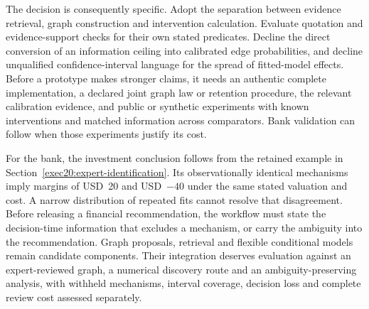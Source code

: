 The decision is consequently specific. Adopt the separation between
evidence retrieval, graph construction and intervention calculation.
Evaluate quotation and evidence-support checks for their own stated
predicates. Decline the direct conversion of an information ceiling into
calibrated edge probabilities, and decline unqualified confidence-interval
language for the spread of fitted-model effects. Before a prototype makes
stronger claims, it needs an authentic complete implementation, a declared
joint graph law or retention procedure, the relevant calibration evidence,
and public or synthetic experiments with known interventions and matched
information across comparators. Bank validation can follow when those
experiments justify its cost.

For the bank, the investment conclusion follows from the retained example in
Section~\ref{exec20:expert-identification}. Its observationally identical
mechanisms imply margins of USD~20 and USD~$-40$ under the same stated
valuation and cost. A narrow distribution of repeated fits cannot resolve
that disagreement. Before releasing a financial recommendation, the workflow
must state the decision-time information that excludes a mechanism, or carry
the ambiguity into the recommendation. Graph proposals, retrieval and flexible
conditional models remain candidate components. Their integration deserves
evaluation against an expert-reviewed graph, a numerical discovery route and
an ambiguity-preserving analysis, with withheld mechanisms, interval coverage,
decision loss and complete review cost assessed separately.
